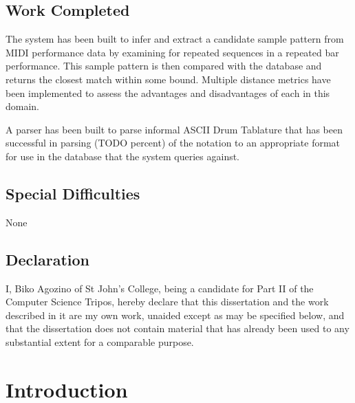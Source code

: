 \documentclass[12pt,twoside,notitlepage]{report}
\begin{document}
\section*{Work Completed}
The system has been built to infer and extract a candidate sample pattern from MIDI performance data by examining for repeated sequences in a repeated bar performance. This sample pattern is then compared with the database and returns the closest match within some bound. Multiple distance metrics have been implemented to assess the advantages and disadvantages of each in this domain.

A parser has been built to parse informal ASCII Drum Tablature that has been successful in parsing (TODO percent) of the notation to an appropriate format for use in the database that the system queries against.


\section*{Special Difficulties}

None
 
\newpage
\section*{Declaration}

I, Biko Agozino of St John's College, being a candidate for Part II of the Computer Science Tripos, hereby declare that this dissertation and the work described in it are my own work, unaided except as may be specified below, and that the dissertation does not contain material that has already been used to any substantial extent for a comparable purpose.

\bigskip
{}

\medskip
{}

\cleardoublepage

\tableofcontents


\newpage



\cleardoublepage        %

\setcounter{page}{1}
\pagestyle{headings}

\chapter{Introduction}
\end{document}
